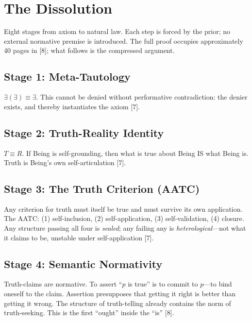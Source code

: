 \documentclass[12pt, letterpaper]{article}
\begin{document}
\section{The Dissolution}

Eight stages from axiom to natural law. Each step is forced by the prior; no external normative premise is introduced. The full proof occupies approximately 40 pages in [8]; what follows is the compressed argument.

\subsection{Stage 1: Meta-Tautology}

$\exists(\exists) \equiv \exists$. This cannot be denied without performative contradiction: the denier exists, and thereby instantiates the axiom [7].

\subsection{Stage 2: Truth-Reality Identity}

$T \equiv R$. If Being is self-grounding, then what is true about Being IS what Being is. Truth is Being's own self-articulation [7].

\subsection{Stage 3: The Truth Criterion (AATC)}

Any criterion for truth must itself be true and must survive its own application. The AATC: (1) self-inclusion, (2) self-application, (3) self-validation, (4) closure. Any structure passing all four is \textit{sealed}; any failing any is \textit{heterological}---not what it claims to be, unstable under self-application [7].

\subsection{Stage 4: Semantic Normativity}

Truth-claims are normative. To assert ``$p$ is true'' is to commit to $p$---to bind oneself to the claim. Assertion presupposes that getting it right is better than getting it wrong. The structure of truth-telling already contains the norm of truth-seeking. This is the first ``ought'' inside the ``is'' [8].
\end{document}
